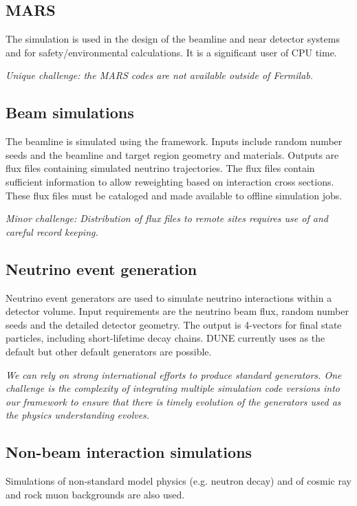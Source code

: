 \documentclass[../main-v1.tex]{subfiles}
\begin{document}
\subsection{MARS}
The \cite{abs1} simulation is used in the design of the beamline and near detector systems and  for safety/environmental calculations.  It is a significant user of CPU time. 

{\it Unique challenge: the MARS codes are not available outside of Fermilab.}

\subsection{Beam simulations}
The  beamline is simulated using the  framework.  Inputs include random number seeds and the beamline and target region geometry and materials.  Outputs are flux files containing simulated neutrino trajectories.  The flux files contain sufficient information to allow reweighting based on interaction cross sections.  These flux files must be cataloged and made available to offline simulation jobs.

{\it Minor challenge:  Distribution of flux files to remote sites requires use of  and careful record keeping.}



\subsection{Neutrino event generation}
Neutrino event generators are used to simulate neutrino interactions within a detector volume.  Input requirements are the neutrino beam flux, random number seeds and the detailed detector geometry. The output is 4-vectors for final state particles, including short-lifetime decay chains.  DUNE currently uses \cite{GENIE} as the default but other default generators are possible. 

{\it We can rely on strong international efforts to produce standard generators. One challenge is the complexity of integrating multiple simulation code versions into our framework to ensure that there is timely evolution of the generators used as the physics understanding evolves.}

\subsection{Non-beam interaction simulations}
Simulations of non-standard model physics (e.g. neutron decay) and of cosmic ray and rock muon backgrounds are also used. 
\end{document}
